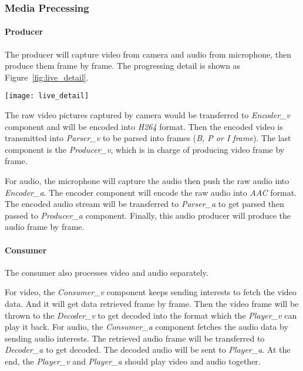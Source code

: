 \subsubsection {Media Precessing}
\paragraph {Producer}
The producer will capture video from camera and audio from microphone, then produce them frame by frame. The progressing detail is shown as Figure~\ref{fig:live_detail}.

\begin{figure*}%
  \centering
  \texttt{[image: live\_detail]}
  \caption{Live Streaming Media Processing}
  \label{fig:live_detail}
\end{figure*}

The raw video pictures captured by camera would be transferred to \textit{Encoder\_v} component and will be encoded into \textit{H264} format. Then the encoded video is transmitted into \textit{Parser\_v} to be parsed into frames (\textit{B, P or I frame}). The last component is the \textit{Producer\_v}, which is in charge of producing video frame by frame.

For audio, the microphone will capture the audio then push the raw audio into \textit{Encoder\_a}. The encoder component will encode the raw audio into \textit{AAC} format. The encoded audio stream will be transferred to \textit{Parser\_a} to get parsed then passed to \textit{Producer\_a} component. Finally, this audio producer will produce the audio frame by frame.

\paragraph {Consumer}
The consumer also processes video and audio separately.

For video, the \textit{Consumer\_v} component keeps sending interests to fetch the video data. And it will get data retrieved frame by frame. Then the video frame will be thrown to the \textit{Decoder\_v} to get decoded into the format which the \textit{Player\_v} can play it back.
For audio, the \textit{Consumer\_a} component fetches the audio data by sending audio interests. The retrieved audio frame will be transferred to \textit{Decoder\_a} to get decoded. The decoded audio will be sent to \textit{Player\_a}. At the end, the \textit{Player\_v} and \textit{Player\_a} should play video and audio together.

